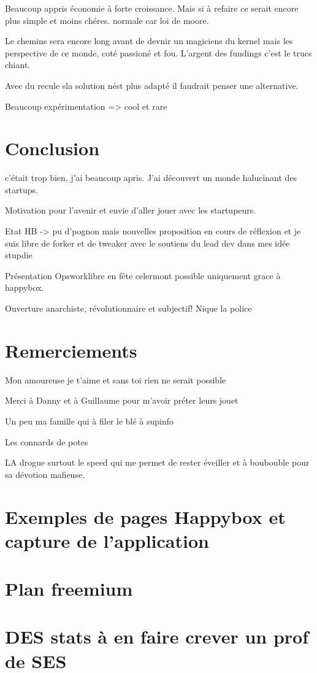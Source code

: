 \documentclass[11pt, a4paper ]{article}
\let\stdsection\section
\renewcommand\section{\newpage\stdsection}
\begin{document}
\begin{spacing}{1.5}
Beaucoup appris économie à forte croissance.
Mais si à refaire ce serait encore plus simple et moins chéres.
normale  car loi  de moore.

Le chemins sera encore long avant de devnir un magiciens du kernel mais les perspective de ce monde, coté passioné et fou. L'argent des fundings c'est le trucs chiant.

Avec du recule sla solution nést plus adapté il faudrait penser une alternative.

Beaucoup expérimentation => cool et rare

	\section{Conclusion} %

		c'était trop bien, j'ai beaucoup apris. J'ai découvert un monde halucinant des startups.

		Motivation pour l'avenir et envie d'aller jouer avec les startupeurs.

		Etat HB -> pu d'pognon mais nouvelles proposition en cours de réflexion et je suis libre de forker et de tweaker avec le soutiens du lead dev dans mes idée stupdie

		Présentation Opsworklibre en fête celermont possible uniquement grace à happybox.

		Ouverture anarchiste, révolutionnaire et subjectif! Nique la police


	\section{Remerciements}

		Mon amoureuse je t'aime et sans toi rien ne serait possible

		Merci à Danny et à Guillaume pour m'avoir préter leurs jouet

		Un peu ma famille qui à filer le blé à supinfo

		Les connards de potes

		LA drogue surtout le speed qui me permet de rester éveiller et à boubouble pour sa dévotion mafieuse.


	\appendix
	\section{Exemples de pages Happybox et capture de l'application}
	\section{Plan freemium}

	\section{DES stats à en faire crever un prof de SES}

	\printindex

	
	
\end{spacing}
\end{document}
